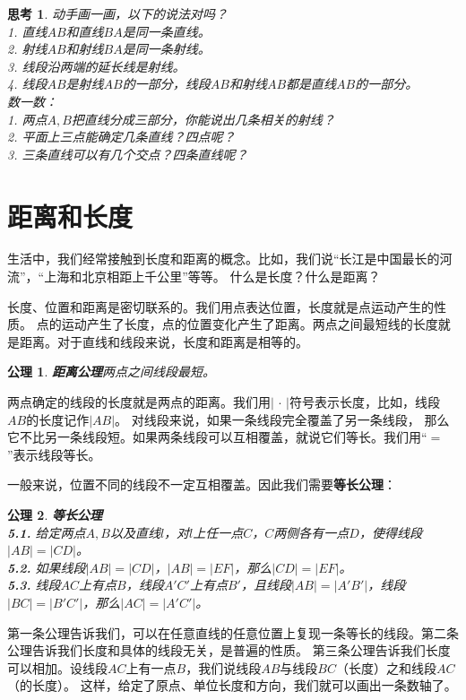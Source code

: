 \documentclass[12pt,UTF8]{ctexbook}
\newtheorem{sk}{思考}[section]
\newtheorem{po}{公理}
\begin{document}
\begin{sk}\label{sk:0-0-0}
    动手画一画，以下的说法对吗？\\
    1. 直线$AB$和直线$BA$是同一条直线。\\
    2. 射线$AB$和射线$BA$是同一条射线。\\
    3. 线段沿两端的延长线是射线。\\
    4. 线段$AB$是射线$AB$的一部分，线段$AB$和射线$AB$都是直线$AB$的一部分。\\
    数一数：\\
    1. 两点$A,B$把直线分成三部分，你能说出几条相关的射线？\\
    2. 平面上三点能确定几条直线？四点呢？\\
    3. 三条直线可以有几个交点？四条直线呢？
\end{sk}

\section{距离和长度}

生活中，我们经常接触到长度和距离的概念。比如，我们说“长江是中国最长的河流”，“上海和北京相距上千公里”等等。
什么是长度？什么是距离？

长度、位置和距离是密切联系的。我们用点表达位置，长度就是点运动产生的性质。
点的运动产生了长度，点的位置变化产生了距离。两点之间最短线的长度就是距离。对于直线和线段来说，长度和距离是相等的。
\begin{po}{\textbf{距离公理}}\label{po:3}
    两点之间线段最短。
\end{po}
两点确定的线段的长度就是两点的距离。我们用$ |\, \cdot\,|$符号表示长度，比如，线段$AB$的长度记作$|AB|$。
对线段来说，如果一条线段完全覆盖了另一条线段，
那么它不比另一条线段短。如果两条线段可以互相覆盖，就说它们等长。我们用“$=$”表示线段等长。

一般来说，位置不同的线段不一定互相覆盖。因此我们需要\textbf{等长公理}：
\begin{po}{\textbf{等长公理}}\label{po:4}
    \mbox{}\\
    \indent \textbf{5.1.} 给定两点$A,B$以及直线$l$，对$l$上任一点$C$，$C$两侧各有一点$D$，使得线段$|AB| = |CD|$。\\
    \indent \textbf{5.2.} 如果线段$|AB| = |CD|$，$|AB| = |EF|$，那么$|CD| = |EF|$。\\
    \indent \textbf{5.3.} 线段$AC$上有点$B$，线段$A'C'$上有点$B'$，且线段$|AB| = |A'B'|$，线段$|BC| = |B'C'|$，那么$|AC| = |A'C'|$。
\end{po}
第一条公理告诉我们，可以在任意直线的任意位置上复现一条等长的线段。第二条公理告诉我们长度和具体的线段无关，是普遍的性质。
第三条公理告诉我们长度可以相加。设线段$AC$上有一点$B$，我们说线段$AB$与线段$BC$（长度）之和线段$AC$（的长度）。
这样，给定了原点、单位长度和方向，我们就可以画出一条数轴了。
\end{document}
